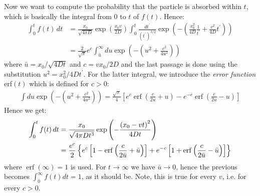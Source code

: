 \documentclass[4apaper,11pt,fleqn]{article}
\theoremstyle{remark}
\theoremstyle{definition}
\begin{document}
Now we want to compute the probability that the particle is absorbed within $t$, which is basically the integral from 0 to $t$ of $f(t)$. Hence:
\begin{align*}
  \int_0^t f(t) \, dt &= \frac{x_{0}}{\sqrt{4 \pi D}} \exp \left(\frac{x_{0} v}{2 D}\right) \int_{0}^{t} \frac{d t^{\prime}}{\left(t^{\prime}\right)^{3 / 2}} \exp \left(-\left(\frac{x_{0}^{2}}{4 D} \frac{1}{t^{\prime}}+\frac{v^{2}}{4 D} t^{\prime}\right)\right) \\
                      &= \frac{2}{\sqrt{\pi}} e^{c} \int_{\bar{u}}^{\infty} d u \exp \left(-\left(u^{2}+\frac{c^{2}}{4 u^{2}}\right)\right)
\end{align*}
where $\bar{u} = x_0/\sqrt{4Dt}$ and $c= v x_0/2D$ and the last passage is done using the substitution $u^2=x_0^2/4Dt^'$.
For the latter integral, we introduce the \emph{error function} erf$(t)$ which is defined for $c>0$:
\begin{align*}
  \int d u \exp \left(-\left(u^{2}+\frac{c^{2}}{4 u^{2}}\right)\right)=\frac{\sqrt{\pi}}{4}\left[e^{c} \operatorname{erf}\left(\frac{c}{2 u}+u\right)-e^{-c} \operatorname{erf}\left(\frac{c}{2 u}-u\right)\right]
\end{align*}
Hence we get:
\begin{align}
  \label{eq:erf}
  \int_0^t f(t) \, dt &= \frac{x_{0}}{\sqrt{4 \pi D t^{3}}} \exp \left(-\frac{\left(x_{0}-v t\right)^{2}}{4 D t}\right)\\ \notag
                      &=  \frac{e^{c}}{2}\left\{e^{c}\left[1-\operatorname{erf}\left(\frac{c}{2 \bar{u}}+\bar{u}\right)\right]+e^{-c}\left[1+\operatorname{erf}\left(\frac{c}{2 \bar{u}}-\bar{u}\right)\right]\right\}
\end{align}
where $\operatorname{erf}(\infty)=1$ is used.
For $t \rightarrow \infty$ we have $\bar{u} \rightarrow 0$, hence the previous becomes $\int_0^\infty f(t) dt = 1$, as it should be. Note, this is true for every $v$, i.e. for every $c>0$.
\end{document}
